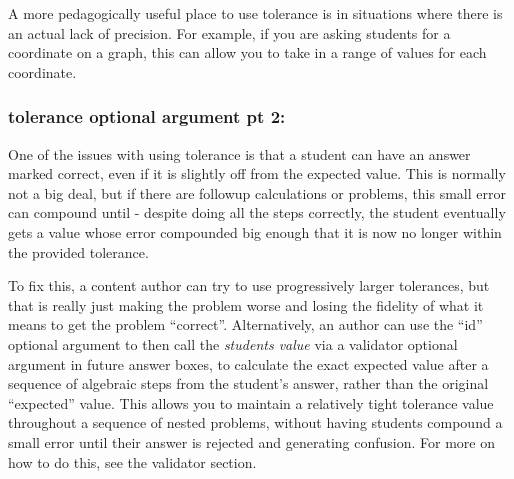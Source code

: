 \documentclass{ximera}
\begin{document}
            A more pedagogically useful place to use tolerance is in situations where there is an actual lack of precision. For example, if you are asking students for a coordinate on a graph, this can allow you to take in a range of values for each coordinate. 
            
        \subsubsection*{tolerance optional argument pt 2:} 
            One of the issues with using tolerance is that a student can have an answer marked correct, even if it is slightly off from the expected value. This is normally not a big deal, but if there are followup calculations or problems, this small error can compound until - despite doing all the steps correctly, the student eventually gets a value whose error compounded big enough that it is now no longer within the provided tolerance.
            
            To fix this, a content author can try to use progressively larger tolerances, but that is really just making the problem worse and losing the fidelity of what it means to get the problem ``correct''. Alternatively, an author can use the ``id'' optional argument to then call the \textit{students value} via a validator optional argument in future answer boxes, to calculate the exact expected value after a sequence of algebraic steps from the student's answer, rather than the original ``expected'' value. This allows you to maintain a relatively tight tolerance value throughout a sequence of nested problems, without having students compound a small error until their answer is rejected and generating confusion. For more on how to do this, see the validator section. 
        
\end{document}
